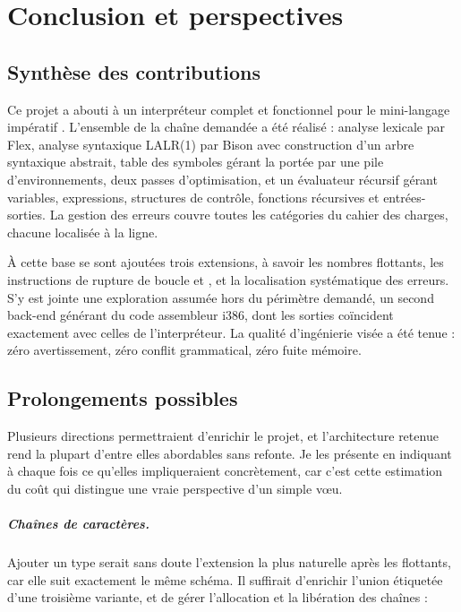 \chapter{Conclusion et perspectives}
\label{chap:conclusion}

\section{Synthèse des contributions}

Ce projet a abouti à un interpréteur complet et fonctionnel pour le mini-langage
impératif \ilang. L'ensemble de la chaîne demandée a été réalisé : analyse
lexicale par Flex, analyse syntaxique LALR(1) par Bison avec construction d'un
arbre syntaxique abstrait, table des symboles gérant la portée par une pile
d'environnements, deux passes d'optimisation, et un évaluateur récursif gérant
variables, expressions, structures de contrôle, fonctions récursives et
entrées-sorties. La gestion des erreurs couvre toutes les catégories du cahier des
charges, chacune localisée à la ligne.

À cette base se sont ajoutées trois extensions, à savoir les nombres flottants,
les instructions de rupture de boucle  et , et la
localisation systématique des erreurs. S'y est jointe une exploration assumée
hors du périmètre demandé, un second back-end générant du code assembleur i386,
dont les sorties coïncident exactement avec celles de l'interpréteur. La qualité d'ingénierie visée a été tenue : zéro
avertissement, zéro conflit grammatical, zéro fuite mémoire.

\section{Prolongements possibles}

Plusieurs directions permettraient d'enrichir le projet, et l'architecture
retenue rend la plupart d'entre elles abordables sans refonte. Je les présente en
indiquant à chaque fois ce qu'elles impliqueraient concrètement, car c'est cette
estimation du coût qui distingue une vraie perspective d'un simple v\oe u.

\paragraph{Chaînes de caractères.} Ajouter un type  serait sans doute
l'extension la plus naturelle après les flottants, car elle suit exactement le
même schéma. Il suffirait d'enrichir l'union étiquetée  d'une
troisième variante, et de gérer l'allocation et la libération des chaînes :

